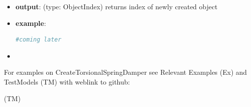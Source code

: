 \begin{itemize}[leftmargin=0.7cm]
\begin{itemize}[leftmargin=1.2cm]
\item[]{\it damping}: scalar damping added to spring
\item[]{\it offset}: scalar offset, which can be used to realize a P-controlled actuator
\item[]{\it velocityOffset}: scalar velocity offset, which can be used to realize a D-controlled actuator
\item[]{\it torque}: additional constant torque added to spring-damper, acting between the two bodies
\item[]{\it useGlobalFrame}: if False, the position and axis vectors are defined in the local coordinate system of body0, otherwise in global (reference) coordinates
\item[]springTorqueUserFunction : a user function springTorqueUserFunction(mbs, t, itemNumber, rotation, angularVelocity, stiffness, damping, offset)->float ; this function replaces the internal connector torque computation
\item[]{\it unlimitedRotations}: if True, an additional generic data node is added to enable measurement of rotations beyond +/- pi; this also allows the spring to cope with multiple turns.
\item[]{\it show}: if True, connector visualization is drawn
\item[]{\it drawSize}: general drawing size of connector
\item[]{\it color}: color of connector
\end{itemize}
\item[--]
{\bf output}: (type: ObjectIndex) returns index of newly created object
\item[--]
{\bf example}: \vspace{-12pt}\ei\begin{lstlisting}[language=Python, xleftmargin=36pt]
  #coming later
\end{lstlisting}\vspace{-24pt}\bi\item[]\vspace{-24pt}\vspace{12pt}\end{itemize}
%

%
\noindent For examples on CreateTorsionalSpringDamper see Relevant Examples (Ex) and TestModels (TM) with weblink to github:
\bi
 \item \footnotesize {} (TM)
\ei

